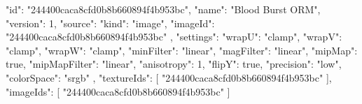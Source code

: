 {
  "id": "244400caca8cfd0b8b660894f4b953bc",
  "name": "Blood Burst ORM",
  "version": 1,
  "source": {
    "kind": "image",
    "imageId": "244400caca8cfd0b8b660894f4b953bc"
  },
  "settings": {
    "wrapU": "clamp",
    "wrapV": "clamp",
    "wrapW": "clamp",
    "minFilter": "linear",
    "magFilter": "linear",
    "mipMap": true,
    "mipMapFilter": "linear",
    "anisotropy": 1,
    "flipY": true,
    "precision": "low",
    "colorSpace": "srgb"
  },
  "textureIds": [
    "244400caca8cfd0b8b660894f4b953bc"
  ],
  "imageIds": [
    "244400caca8cfd0b8b660894f4b953bc"
  ]
}
